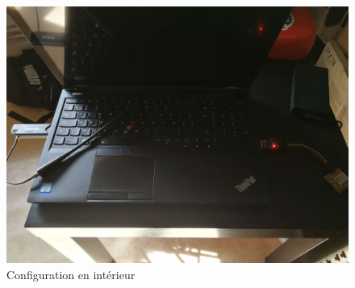 \begin{figure}[h]
\centering

\includegraphics[scale=0.08]{images/conf1.png}
\caption{Configuration en intérieur}\label{term312}
\end{figure}
